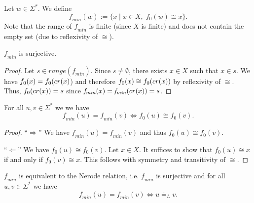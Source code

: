 
\begin{definition}
    \label{f_min}
    Let $w \in \Sigma^*$. We define
    \begin{equation*}
        \mathit{f_{min}}(w) := \{ x \; | \; x \in X, \; {f_0}(w) \cong x \}.
    \end{equation*}
    Note that the range of $\mathit{f_{min}}$ is finite (since $X$ is finite) and does not contain the empty set (due to reflexivity of $\cong$).
\end{definition}

\begin{lemma}
    \label{f_min_surjective}
    $\mathit{f_{min}}$ is surjective.
\end{lemma}
\begin{proof}
    Let $s \in range(\mathit{f_{min}})$. 
    Since $s \neq \emptyset$, 
    there exists $x \in X$ such that $x \in s$.
    We have ${f_0}(x) = {f_0}(cr(x)$) and therefore ${f_0}(x) \cong {f_0}(cr(x))$ by reflexivity of $\cong$.
    Thus, ${f_0}(cr(x)) = s$ since  $\mathit{f_{min}}(x) = \mathit{f_{min}}(cr(x)) = s$.
\end{proof}

\begin{lemma}
    \label{f_minP}
    For all $u,v \in \Sigma^*$ we we have 
    \begin{equation*}
        \mathit{f_{min}}(u) = \mathit{f_{min}}(v) \iff {f_0}(u) \cong {f_0}(v).
    \end{equation*}
\end{lemma}

\begin{proof}
    ``$\Rightarrow$''
    We have $\mathit{f_{min}}(u) = \mathit{f_{min}}(v)$ and thus ${f_0}(u) \cong {f_0}(v)$.

    ``$\Leftarrow$''
    We have ${f_0}(u) \cong {f_0}(v)$. 
    Let $x \in X$.
    It suffices to show that ${f_0}(u) \cong x$ if and only if ${f_0}(v) \cong x$.
    This follows with symmetry and transitivity of $\cong$.
\end{proof}

\begin{lemma}
    \label{f_min_correct}
    $\mathit{f_{min}}$ is equivalent to the Nerode relation, i.e. $\mathit{f_{min}}$ is surjective and for all $u,v \in \Sigma^*$ we have
    \begin{equation*}
        \mathit{f_{min}}(u) = \mathit{f_{min}}(v) \iff u \doteq_L v.
    \end{equation*}
\end{lemma}

